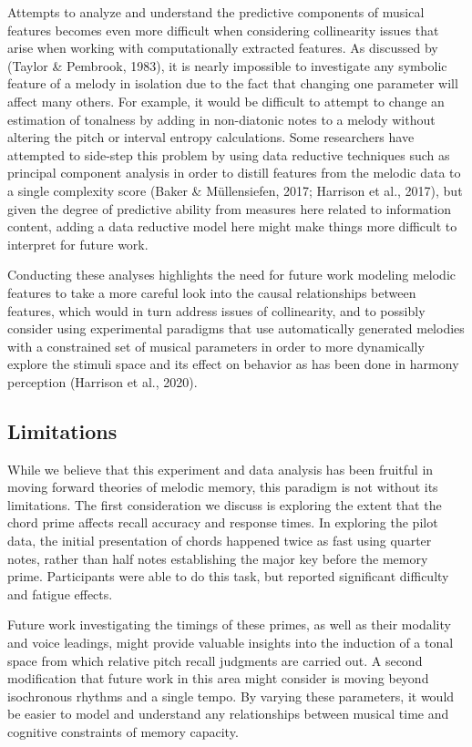 \documentclass[english,man,floatsintext]{apa6}
\begin{document}
Attempts to analyze and understand the predictive components of musical features becomes even more difficult when considering collinearity issues that arise when working with computationally extracted features.
As discussed by (Taylor \& Pembrook, 1983), it is nearly impossible to investigate any symbolic feature of a melody in isolation due to the fact that changing one parameter will affect many others.
For example, it would be difficult to attempt to change an estimation of tonalness by adding in non-diatonic notes to a melody without altering the pitch or interval entropy calculations.
Some researchers have attempted to side-step this problem by using data reductive techniques such as principal component analysis in order to distill features from the melodic data to a single complexity score (Baker \& Müllensiefen, 2017; Harrison et al., 2017), but given the degree of predictive ability from measures here related to information content, adding a data reductive model here might make things more difficult to interpret for future work.

Conducting these analyses highlights the need for future work modeling melodic features to take a more careful look into the causal relationships between features, which would in turn address issues of collinearity, and to possibly consider using experimental paradigms that use automatically generated melodies with a constrained set of musical parameters in order to more dynamically explore the stimuli space and its effect on behavior as has been done in harmony perception (Harrison et al., 2020).

\hypertarget{limitations}{%
\subsection{Limitations}\label{limitations}}

While we believe that this experiment and data analysis has been fruitful in moving forward theories of melodic memory, this paradigm is not without its limitations.
The first consideration we discuss is exploring the extent that the chord prime affects recall accuracy and response times.
In exploring the pilot data, the initial presentation of chords happened twice as fast using quarter notes, rather than half notes establishing the major key before the memory prime.
Participants were able to do this task, but reported significant difficulty and fatigue effects.

Future work investigating the timings of these primes, as well as their modality and voice leadings, might provide valuable insights into the induction of a tonal space from which relative pitch recall judgments are carried out.
A second modification that future work in this area might consider is moving beyond isochronous rhythms and a single tempo.
By varying these parameters, it would be easier to model and understand any relationships between musical time and cognitive constraints of memory capacity.
\end{document}
